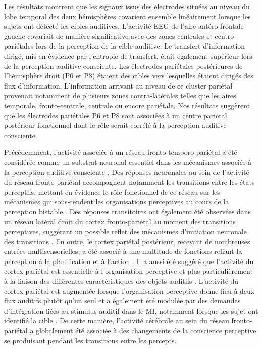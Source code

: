 Les résultats montrent que les signaux issus des électrodes situées au niveau du lobe temporal des deux hémisphères covarient ensemble linéairement lorsque les sujets ont détecté les cibles auditives.
L'activité EEG de l'aire antéro-frontale gauche covariait de manière significative avec des zones centrales et centro-pariétales lors de la perception de la cible auditive. 
Le transfert d'information dirigé, mis en évidence par l'entropie de transfert, était également supérieur lors de la perception auditive consciente. 
Les électrodes pariétales postérieures de l'hémisphère droit (P6 et P8) étaient des cibles vers lesquelles étaient dirigés des flux d'information. 
L'information arrivant au niveau de ce cluster pariétal provenait notamment de plusieurs zones contra-latérales telles que les aires temporale, fronto-centrale, centrale ou encore pariétale. 
Nos résultats suggèrent que les électrodes pariétales P6 et P8 sont associées à un centre pariétal postérieur fonctionnel dont le rôle serait corrélé à la perception auditive consciente. 

Précédemment, l'activité associée à un réseau fronto-temporo-pariétal a été considérée comme un substrat neuronal essentiel dans les mécanismes associés à la perception auditive consciente \citep{demertzi2013consciousness, dykstra2017roadmap, eklund2019electrophysiological, eriksson2007similar, eriksson2017activity, giani2015detecting, wiegand2018cortical}. 
Des réponses neuronales au sein de l'activité du réseau fronto-pariétal accompagnent notamment les transitions entre les états perceptifs, mettant en évidence le rôle fonctionnel de ce réseau sur les mécanismes qui sous-tendent les organisations perceptives au cours de la perception bistable \citep{knapen2011role}.
Des réponses transitoires ont également été observées dans un réseau latéral droit du cortex fronto-pariétal au moment des transitions perceptives, suggérant un possible reflet des mécanismes d'initiation neuronale des transitions \citep{kleinschmidt2002human, lumer1998neural, sterzer2007neural}. 
En outre, le cortex pariétal postérieur, recevant de nombreuses entrées multisensorielles, a été associé à une multitude de fonctions reliant la perception à la planification et à l'action \citep{andersen2009intention}.
Il a aussi été suggéré que l'activité du cortex pariétal est essentielle à l'organisation perceptive et plus particulièrement à la liaison des différentes caractéristiques des objets auditifs \citep{cusack2005intraparietal}. 
L'activité du cortex pariétal est augmentée lorsque l'organisation perceptive donne lieu à deux flux auditifs plutôt qu'un seul et a également été modulée par des demandes d'intégration liées au stimulus auditif dans le MI, notamment lorsque les sujet ont identifié la cible \citep{eriksson2017activity}. 
De cette manière, l'activité cérébrale au sein du réseau fronto-pariétal a globalement été associée à des changements de la conscience perceptive se produisant pendant les transitions entre les percepts. 

